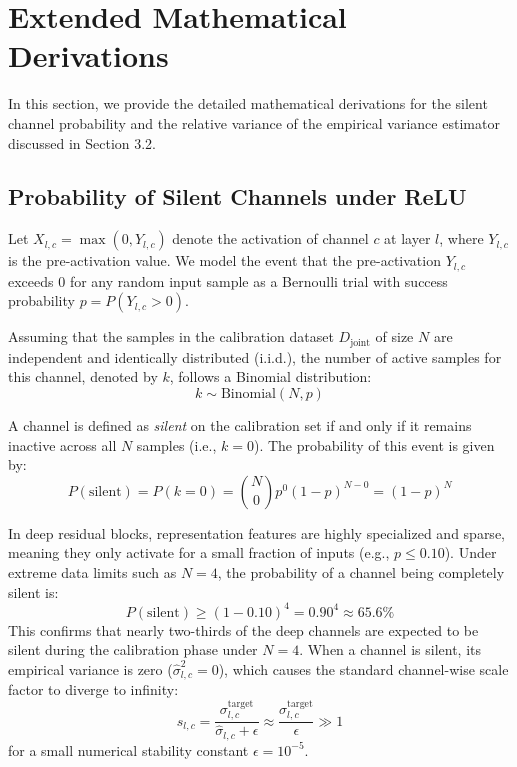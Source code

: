 \documentclass{article}
\begin{document}
\clearpage



\clearpage
\appendix
\section{Extended Mathematical Derivations}
\label{sec:appendix_math}

In this section, we provide the detailed mathematical derivations for the silent channel probability and the relative variance of the empirical variance estimator discussed in Section 3.2.

\subsection{Probability of Silent Channels under ReLU}
Let $X_{l,c} = \max(0, Y_{l,c})$ denote the activation of channel $c$ at layer $l$, where $Y_{l,c}$ is the pre-activation value. We model the event that the pre-activation $Y_{l,c}$ exceeds 0 for any random input sample as a Bernoulli trial with success probability $p = P(Y_{l,c} > 0)$. 

Assuming that the samples in the calibration dataset $D_{\text{joint}}$ of size $N$ are independent and identically distributed (i.i.d.), the number of active samples for this channel, denoted by $k$, follows a Binomial distribution:
\begin{equation}
k \sim \text{Binomial}(N, p)
\end{equation}

A channel is defined as \emph{silent} on the calibration set if and only if it remains inactive across all $N$ samples (i.e., $k = 0$). The probability of this event is given by:
\begin{equation}
P(\text{silent}) = P(k = 0) = \binom{N}{0} p^0 (1 - p)^{N - 0} = (1 - p)^N
\end{equation}

In deep residual blocks, representation features are highly specialized and sparse, meaning they only activate for a small fraction of inputs (e.g., $p \le 0.10$). Under extreme data limits such as $N=4$, the probability of a channel being completely silent is:
\begin{equation}
P(\text{silent}) \ge (1 - 0.10)^4 = 0.90^4 \approx 65.6\%
\end{equation}
This confirms that nearly two-thirds of the deep channels are expected to be silent during the calibration phase under $N=4$. When a channel is silent, its empirical variance is zero ($\hat{\sigma}^2_{l,c} = 0$), which causes the standard channel-wise scale factor to diverge to infinity:
\begin{equation}
s_{l,c} = \frac{\sigma^{\text{target}}_{l,c}}{\hat{\sigma}_{l,c} + \epsilon} \approx \frac{\sigma^{\text{target}}_{l,c}}{\epsilon} \gg 1
\end{equation}
for a small numerical stability constant $\epsilon = 10^{-5}$.
\end{document}
